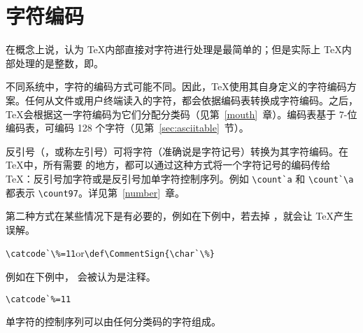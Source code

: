 \documentclass{book}
\begin{document}
\section{字符编码}
\label{char:code}

在概念上说，认为 \TeX 内部直接对字符进行处理是最简单的；但是实际上 \TeX 内部处理的是整数，即。

不同系统中，字符的编码方式可能不同。因此，\TeX 使用其自身定义的字符编码方案。任何从文件或用户终端读入的字符，都会依据编码表转换成字符编码。之后，\TeX 会根据这一字符编码为它们分配分类码（见第~\ref{mouth}~章）。编码表基于 7-位 \ascii 编码表，可编码 128 个字符（见第~\ref{sec:asciitable}~节）。

反引号（，或称左引号）可将字符（准确说是字符记号）转换为其字符编码。在 \TeX 中，所有需要  的地方，都可以通过这种方式将一个字符记号的编码传给 \TeX：反引号加字符或是反引号加单字符控制序列。例如 \verb.\count`a. 和 \verb.\count`\a. 都表示 \verb.\count97.。详见第~\ref{number}~章。

第二种方式在某些情况下是有必要的，例如在下例中，若去掉 \cs{}，就会让 \TeX 产生误解。
\begin{disp}\verb>\catcode`\%=11>\quad or\quad \verb>\def\CommentSign{\char`\%}>\end{disp}
例如在下例中， 会被认为是注释。
\begin{verbatim}
\catcode`%=11
\end{verbatim}
单字符的控制序列可以由任何分类码的字符组成。
\end{document}
